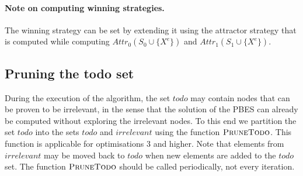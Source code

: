 \documentclass{article}
\begin{document}
\paragraph{Note on computing winning strategies.} The winning strategy can be set by extending
it using the attractor strategy that is computed while
computing $Attr_0(S_0 \cup \{X^e\})$ and $Attr_1(S_1 \cup \{X^e\})$.

\subsection{Pruning the todo set}

During the execution of the algorithm, the set $todo$ may contain nodes that can be proven to
be irrelevant, in the sense that the solution of the PBES can already be computed without exploring the irrelevant nodes. To this end we partition the set $todo$ into the sets $todo$ and $irrelevant$ using the function $\textsc{PruneTodo}$. This function is applicable for optimisations 3 and higher. Note that elements from $irrelevant$ may be moved back to $todo$ when new elements are added to the $todo$ set.
The function $\textsc{PruneTodo}$ should be called periodically, not every iteration.
\end{document}
